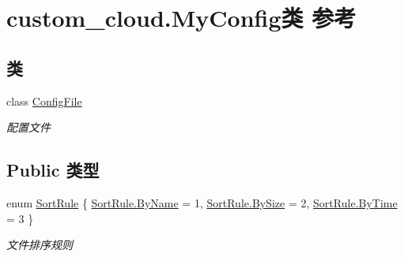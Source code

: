 \hypertarget{classcustom__cloud_1_1_my_config}{}\section{custom\+\_\+cloud.\+My\+Config类 参考}
\label{classcustom__cloud_1_1_my_config}
\subsection*{类}
\begin{DoxyCompactItemize}
\item 
class \hyperlink{classcustom__cloud_1_1_my_config_1_1_config_file}{Config\+File}
\begin{DoxyCompactList}\small\item\em 配置文件 \end{DoxyCompactList}\end{DoxyCompactItemize}
\subsection*{Public 类型}
\begin{DoxyCompactItemize}
\item 
enum \hyperlink{classcustom__cloud_1_1_my_config_a668041e41563ad4f5d75f5ed1984b05f}{Sort\+Rule} \{ \hyperlink{classcustom__cloud_1_1_my_config_a668041e41563ad4f5d75f5ed1984b05fa4adda6c078fdeb347d94c3ab2ff88804}{Sort\+Rule.\+By\+Name} = 1, 
\hyperlink{classcustom__cloud_1_1_my_config_a668041e41563ad4f5d75f5ed1984b05fad08bb4d3931bfbce971c58a47375034b}{Sort\+Rule.\+By\+Size} = 2, 
\hyperlink{classcustom__cloud_1_1_my_config_a668041e41563ad4f5d75f5ed1984b05fa8dc8d08da649a68d4b9af08fa27d662f}{Sort\+Rule.\+By\+Time} = 3
 \}\begin{DoxyCompactList}\small\item\em 文件排序规则 \end{DoxyCompactList}
\end{DoxyCompactItemize}
